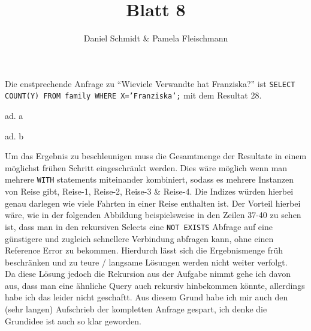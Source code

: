 \documentclass[12pt,a4paper]{amsart}
\begin{document}
\title{Blatt 8}

\author{Daniel Schmidt \& Pamela Fleischmann}

\maketitle

\begin{aufgabe1}


Die enstprechende Anfrage zu ``Wieviele Verwandte hat Franziska?'' ist \texttt{SELECT COUNT(Y) FROM family WHERE X='Franziska';} mit dem Resultat 28.
\end{aufgabe1}


\begin{aufgabe1}
ad. a



ad. b

Um das Ergebnis zu beschleunigen muss die Gesamtmenge der Resultate in einem möglichst frühen Schritt eingeschränkt werden. Dies wäre möglich wenn man mehrere \texttt{WITH} statements miteinander kombiniert, sodass es mehrere Instanzen von Reise gibt, Reise-1, Reise-2, Reise-3 \& Reise-4. Die Indizes würden hierbei genau darlegen wie viele Fahrten in einer Reise enthalten ist. Der Vorteil hierbei wäre, wie in der folgenden Abbildung beispielsweise in den Zeilen 37-40 zu sehen ist, dass man in den rekursiven Selects eine \texttt{NOT EXISTS} Abfrage auf eine günstigere und zugleich schnellere Verbindung abfragen kann, ohne einen Reference Error zu bekommen. Hierdurch lässt sich die Ergebnismenge früh beschränken und zu teure / langsame Lösungen werden nicht weiter verfolgt.  \\



Da diese Lösung jedoch die Rekursion aus der Aufgabe nimmt gehe ich davon aus, dass man eine ähnliche Query auch rekursiv hinbekommen könnte, allerdings habe ich das leider nicht geschaftt. Aus diesem Grund habe ich mir auch den (sehr langen) Aufschrieb der kompletten Anfrage gespart, ich denke die Grundidee ist auch so klar geworden.



\end{aufgabe1}

\begin{aufgabe1}
\end{aufgabe1}
\end{document}
